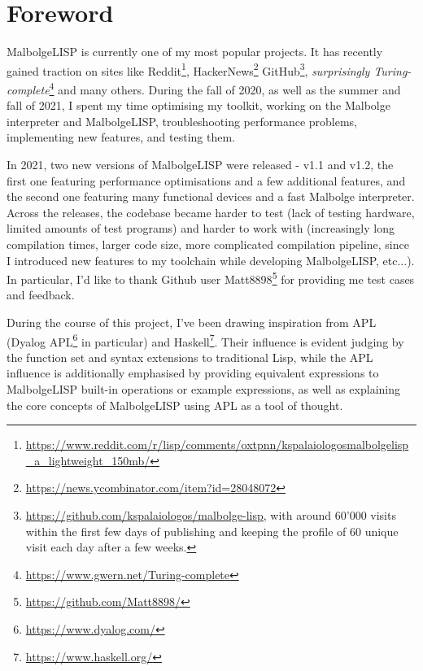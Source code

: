 
\chapter*{Foreword}
\par MalbolgeLISP is currently one of my most popular projects. It has recently gained traction on sites like Reddit\footnote{\url{https://www.reddit.com/r/lisp/comments/oxtpnn/kspalaiologosmalbolgelisp_a_lightweight_150mb/}}, HackerNews\footnote{\url{https://news.ycombinator.com/item?id=28048072}} GitHub\footnote{\url{https://github.com/kspalaiologos/malbolge-lisp}, with around 60'000 visits within the first few days of publishing and keeping the profile of 60 unique visit each day after a few weeks.}, \textit{surprisingly Turing-complete}\footnote{\url{https://www.gwern.net/Turing-complete}} and many others. During the fall of 2020, as well as the summer and fall of 2021, I spent my time optimising my toolkit, working on the Malbolge interpreter and MalbolgeLISP, troubleshooting performance problems, implementing new features, and testing them.

\par In 2021, two new versions of MalbolgeLISP were released - v1.1 and v1.2, the first one featuring performance optimisations and a few additional features, and the second one featuring many functional devices and a fast Malbolge interpreter. Across the releases, the codebase became harder to test (lack of testing hardware, limited amounts of test programs) and harder to work with (increasingly long compilation times, larger code size, more complicated compilation pipeline, since I introduced new features to my toolchain while developing MalbolgeLISP, etc...). In particular, I'd like to thank Github user Matt8898\footnote{\url{https://github.com/Matt8898/}} for providing me test cases and feedback.

\par During the course of this project, I've been drawing inspiration from APL (Dyalog APL\footnote{\url{https://www.dyalog.com/}} in particular) and Haskell\footnote{\url{https://www.haskell.org/}}. Their influence is evident judging by the function set and syntax extensions to traditional Lisp, while the APL influence is additionally emphasised by providing equivalent expressions to MalbolgeLISP built-in operations or example expressions, as well as explaining the core concepts of MalbolgeLISP using APL as a tool of thought.
